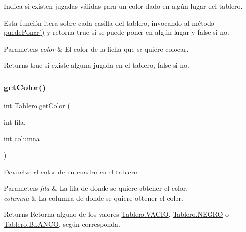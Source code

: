 Indica si existen jugadas válidas para un color dado en algún lugar del tablero. 

Esta función itera sobre cada casilla del tablero, invocando al método \mbox{\hyperlink{class_tablero_afbf952c36374051ba9d9a007ad2c673d}{puede\+Poner()}} y retorna true si se puede poner en algún lugar y false si no.


\begin{DoxyParams}{Parameters}
{\em color} & El color de la ficha que se quiere colocar. \\
\hline
\end{DoxyParams}
\begin{DoxyReturn}{Returns}
true si existe alguna jugada en el tablero, false si no. 
\end{DoxyReturn}
\mbox{\label{class_tablero_a885e7de2aeb202acd70c1ac8896ad1c1}} 
\subsubsection{\texorpdfstring{get\+Color()}{getColor()}}
{\footnotesize\ttfamily int Tablero.\+get\+Color (\begin{DoxyParamCaption}\item[{int}]{fila,  }\item[{int}]{columna }\end{DoxyParamCaption})}



Devuelve el color de un cuadro en el tablero. 


\begin{DoxyParams}{Parameters}
{\em fila} & La fila de donde se quiere obtener el color. \\
\hline
{\em columna} & La columna de donde se quiere obtener el color. \\
\hline
\end{DoxyParams}
\begin{DoxyReturn}{Returns}
Retorna alguno de los valores \mbox{\hyperlink{class_tablero_abbd0033f1dfd3e3d30c1b11472d057c9}{Tablero.\+V\+A\+C\+IO}}, \mbox{\hyperlink{class_tablero_a0ef9ac784851be4a99984b6a2dcede58}{Tablero.\+N\+E\+G\+RO}} o \mbox{\hyperlink{class_tablero_a28a1e0a4c4362e5cbcb2505b660c6855}{Tablero.\+B\+L\+A\+N\+CO}}, según corresponda. 
\end{DoxyReturn}
\mbox{\label{class_tablero_a22addb609780226aa6371c818b4d5a12}} 
